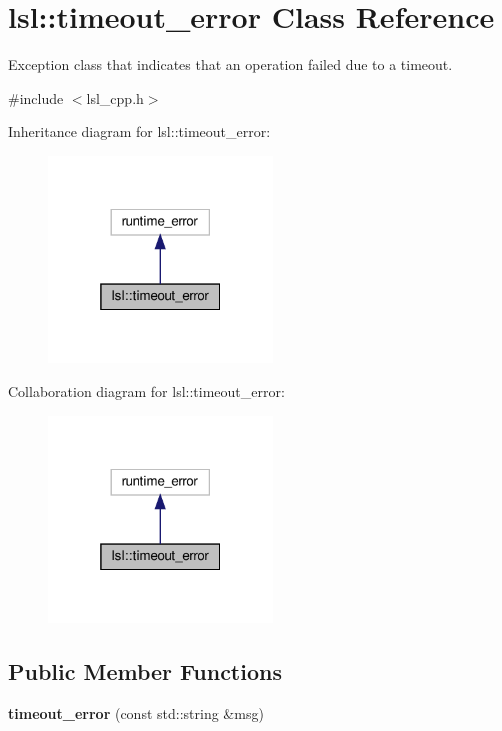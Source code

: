 \hypertarget{classlsl_1_1timeout__error}{}\section{lsl\+:\+:timeout\+\_\+error Class Reference}
\label{classlsl_1_1timeout__error}


Exception class that indicates that an operation failed due to a timeout.  




{\ttfamily \#include $<$lsl\+\_\+cpp.\+h$>$}



Inheritance diagram for lsl\+:\+:timeout\+\_\+error\+:
\nopagebreak
\begin{figure}[H]
\begin{center}
\leavevmode
\includegraphics[width=169pt]{d9/d05/classlsl_1_1timeout__error__inherit__graph}
\end{center}
\end{figure}


Collaboration diagram for lsl\+:\+:timeout\+\_\+error\+:
\nopagebreak
\begin{figure}[H]
\begin{center}
\leavevmode
\includegraphics[width=169pt]{d4/d2c/classlsl_1_1timeout__error__coll__graph}
\end{center}
\end{figure}
\subsection*{Public Member Functions}
\begin{DoxyCompactItemize}
\item 
\mbox{\label{classlsl_1_1timeout__error_afbc3b7c957fe3da4021aff3c30e6192f}} 
{\bfseries timeout\+\_\+error} (const std\+::string \&msg)
\end{DoxyCompactItemize}


